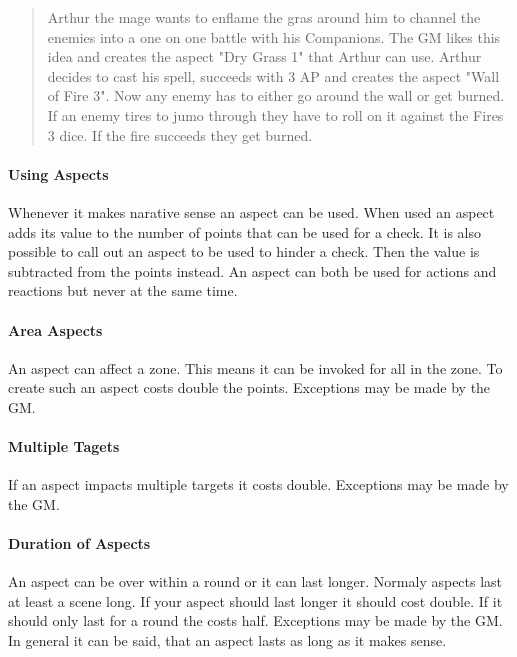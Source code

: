 \documentclass[11pt]{article}
\begin{document}
{\begin{quote}
Arthur the mage wants to enflame the gras around him to channel the enemies into a one on one battle with his Companions. The GM likes this idea and creates the aspect "Dry Grass 1" that Arthur can use. Arthur decides to cast his spell, succeeds with 3 AP and creates the aspect "Wall of Fire 3". Now any enemy has to either go around the wall or get burned. If an enemy tires to jumo through they have to roll on it against the Fires 3 dice. If the fire succeeds they get burned.
\end{quote}

\paragraph*{Using Aspects}
\label{sec:org55fc145}

Whenever it makes narative sense an aspect can be used. When used an aspect adds its value to the number of points that can be used for a check. It is also possible to call out an aspect to be used to hinder a check. Then the value is subtracted from the points instead. An aspect can both be used for actions and reactions but never at the same time.

\paragraph*{Area Aspects}
\label{sec:org6fc63c1}

An aspect can affect a zone. This means it can be invoked for all in the zone. To create such an aspect costs double the points. Exceptions may be made by the GM. 

\paragraph*{Multiple Tagets}
\label{sec:org8e73fd4}

If an aspect impacts multiple targets it costs double. Exceptions may be made by the GM.

\paragraph*{Duration of Aspects}
\label{sec:orgc0b7a69}

An aspect can be over within a round or it can last longer. Normaly aspects last at least a scene long. If your aspect should last longer it should cost double. If it should only last for a round the costs half. Exceptions may be made by the GM. In general it can be said, that an aspect lasts as long as it makes sense.

}
\end{document}
